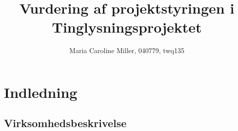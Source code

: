 \documentclass[10pt,a4paper,danish]{article}
\title{Vurdering af projektstyringen i Tinglysningsprojektet}
\author{Maria Caroline Miller, 040779, twq135}
\begin{document}
\maketitle
\newpage

\tableofcontents
\newpage

\section{Indledning}



\subsection{Virksomhedsbeskrivelse}

\end{document}
